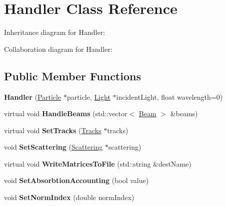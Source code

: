 \hypertarget{class_handler}{}\section{Handler Class Reference}
\label{class_handler}


Inheritance diagram for Handler\+:


Collaboration diagram for Handler\+:
\subsection*{Public Member Functions}
\begin{DoxyCompactItemize}
\item 
\mbox{\label{class_handler_a66ed760e6f799ed1c23bb7a6e911877a}} 
{\bfseries Handler} (\mbox{\hyperlink{class_particle}{Particle}} $\ast$particle, \mbox{\hyperlink{class_light}{Light}} $\ast$incident\+Light, float wavelength=0)
\item 
\mbox{\label{class_handler_a05194b66451cc40133c4bd1a209ad530}} 
virtual void {\bfseries Handle\+Beams} (std\+::vector$<$ \mbox{\hyperlink{class_beam}{Beam}} $>$ \&beams)
\item 
\mbox{\label{class_handler_a3ef5c3e3392e658c693275a4d46567ba}} 
virtual void {\bfseries Set\+Tracks} (\mbox{\hyperlink{class_tracks}{Tracks}} $\ast$tracks)
\item 
\mbox{\label{class_handler_ae113de0f27a2bac6dbd556c7162aed3e}} 
void {\bfseries Set\+Scattering} (\mbox{\hyperlink{class_scattering}{Scattering}} $\ast$scattering)
\item 
\mbox{\label{class_handler_a36b5f50775023a5d8acaf5b57e2295b2}} 
virtual void {\bfseries Write\+Matrices\+To\+File} (std\+::string \&dest\+Name)
\item 
\mbox{\label{class_handler_a4e0616dee14ef67e077209a66f9d48d7}} 
void {\bfseries Set\+Absorbtion\+Accounting} (bool value)
\item 
\mbox{\label{class_handler_af47c4ac1eeb273bd27d8e6688131ff6c}} 
void {\bfseries Set\+Norm\+Index} (double norm\+Index)
\end{DoxyCompactItemize}
